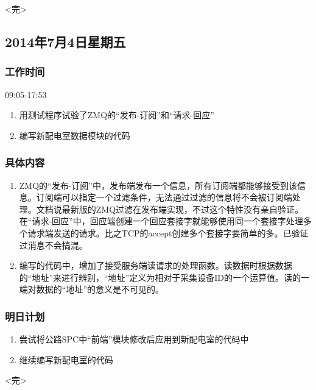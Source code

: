 \documentclass[11pt]{article}
\begin{document}
\begin{center}
  <完>
\end{center}

\newpage

\subsection{2014年7月4日星期五}
\subsubsection{工作时间}

  09:05-17:53

  \begin{enumerate}
  \item 用测试程序试验了ZMQ的“发布-订阅”和“请求-回应”
  \item 编写新配电室数据模块的代码
  \end{enumerate}
\subsubsection{具体内容}
  \begin{enumerate}
  \item ZMQ的“发布-订阅”中，发布端发布一个信息，所有订阅端都能够接受到该信息。订阅端可以指定一个过滤条件，无法通过过滤的信息将不会被订阅端处理。文档说最新版的ZMQ过滤在发布端实现，不过这个特性没有亲自验证。在“请求-回应”中，回应端创建一个回应套接字就能够使用同一个套接字处理多个请求端发送的请求。比之TCP的accept创建多个套接字要简单的多。已验证过消息不会搞混。
  \item 编写的代码中，增加了接受服务端读请求的处理函数。读数据时根据数据的“地址”来进行辨别，“地址”定义为相对于采集设备ID的一个运算值。读的一端对数据的“地址”的意义是不可见的。
  \end{enumerate}
\subsubsection{明日计划}
  \begin{enumerate}
  \item 尝试将公路SPC中“前端”模块修改后应用到新配电室的代码中
  \item 继续编写新配电室的代码
  \end{enumerate}


\begin{center}
  <完>
\end{center}

\newpage
\end{document}
